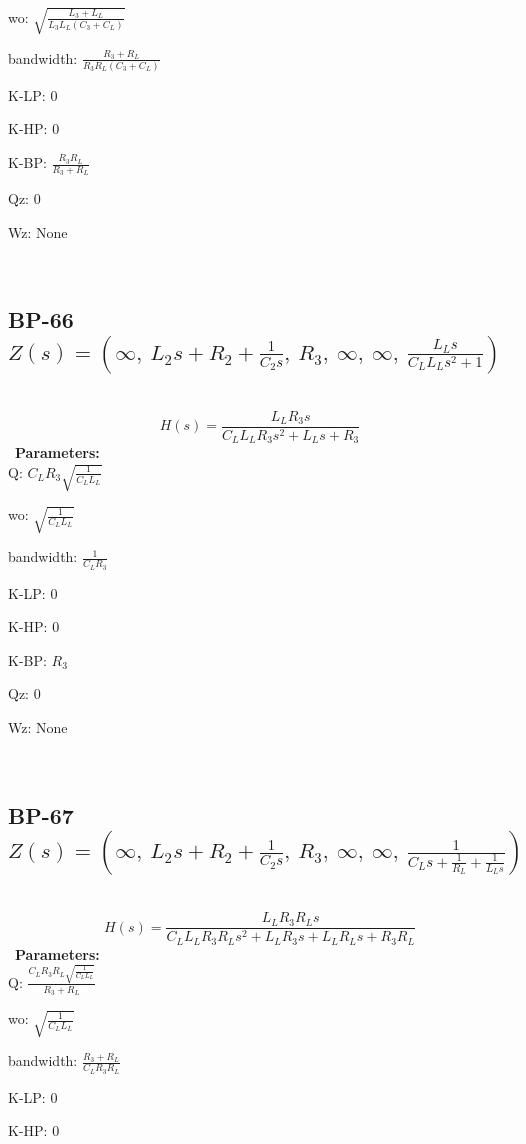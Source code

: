 \documentclass{article}
\begin{document}
wo: $\sqrt{\frac{L_{3} + L_{L}}{L_{3} L_{L} \left(C_{3} + C_{L}\right)}}$\ 

bandwidth: $\frac{R_{3} + R_{L}}{R_{3} R_{L} \left(C_{3} + C_{L}\right)}$\ 

K-LP: $0$\ 

K-HP: $0$\ 

K-BP: $\frac{R_{3} R_{L}}{R_{3} + R_{L}}$\ 

Qz: $0$\ 

Wz: $\text{None}$\ 

\ 

\subsection{BP-66 $Z(s) = \left( \infty, \  L_{2} s + R_{2} + \frac{1}{C_{2} s}, \  R_{3}, \  \infty, \  \infty, \  \frac{L_{L} s}{C_{L} L_{L} s^{2} + 1}\right)$ } \ 
\textbf{\[H(s) = \frac{L_{L} R_{3} s}{C_{L} L_{L} R_{3} s^{2} + L_{L} s + R_{3}}\] } \ 
\textbf{Parameters:}\\ 

Q: $C_{L} R_{3} \sqrt{\frac{1}{C_{L} L_{L}}}$\ 

wo: $\sqrt{\frac{1}{C_{L} L_{L}}}$\ 

bandwidth: $\frac{1}{C_{L} R_{3}}$\ 

K-LP: $0$\ 

K-HP: $0$\ 

K-BP: $R_{3}$\ 

Qz: $0$\ 

Wz: $\text{None}$\ 

\ 

\subsection{BP-67 $Z(s) = \left( \infty, \  L_{2} s + R_{2} + \frac{1}{C_{2} s}, \  R_{3}, \  \infty, \  \infty, \  \frac{1}{C_{L} s + \frac{1}{R_{L}} + \frac{1}{L_{L} s}}\right)$ } \ 
\textbf{\[H(s) = \frac{L_{L} R_{3} R_{L} s}{C_{L} L_{L} R_{3} R_{L} s^{2} + L_{L} R_{3} s + L_{L} R_{L} s + R_{3} R_{L}}\] } \ 
\textbf{Parameters:}\\ 

Q: $\frac{C_{L} R_{3} R_{L} \sqrt{\frac{1}{C_{L} L_{L}}}}{R_{3} + R_{L}}$\ 

wo: $\sqrt{\frac{1}{C_{L} L_{L}}}$\ 

bandwidth: $\frac{R_{3} + R_{L}}{C_{L} R_{3} R_{L}}$\ 

K-LP: $0$\ 

K-HP: $0$\ 
\end{document}
